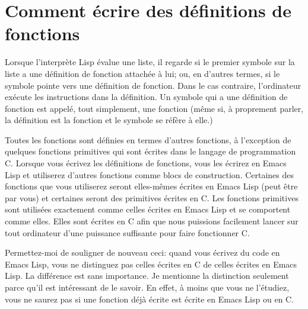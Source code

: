\chapter{Comment écrire des définitions de fonctions}

Lorsque l'interprète Lisp évalue une liste, il regarde si le premier
symbole sur la liste a une définition de fonction attachée à lui; ou,
en d'autres termes, si le symbole pointe vers une définition de
fonction. Dans le cas contraire, l'ordinateur exécute les instructions
dans la définition. Un symbole qui a une définition de fonction est
appelé, tout simplement, une fonction (même si, à proprement parler,
la définition est la fonction et le symbole se réfère à elle.)

Toutes les fonctions sont définies en termes d'autres fonctions, à
l'exception de quelques fonctions primitives qui sont écrites dans le
langage de programmation C. Lorsque vous écrivez les définitions de
fonctions, vous les écrirez en Emacs Lisp et utiliserez d'autres
fonctions comme blocs de construction. Certaines des fonctions que
vous utiliserez seront elles-mêmes écrites en Emacs Lisp (peut être
par vous) et certaines seront des primitives écrites en C. Les
fonctions primitives sont utilisées exactement comme celles écrites en
Emacs Lisp et se comportent comme elles. Elles sont écrites en C afin
que nous puissions facilement lancer \gem sur tout ordinateur d'une
puissance suffisante pour faire fonctionner C.

Permettez-moi de souligner de nouveau ceci: quand vous écrivez du code
en Emacs Lisp, vous ne distinguez pas celles écrites en C de celles
écrites en Emacs Lisp. La différence est sans importance. Je mentionne
la distinction seulement parce qu'il est intéressant de le savoir. En
effet, à moins que vous ne l'étudiez, vous ne saurez pas si une
fonction déjà écrite est écrite en Emacs Lisp ou en C.



























